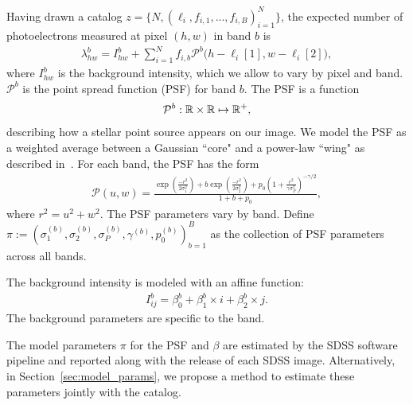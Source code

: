 Having drawn a catalog $z = \{N, (\ell_i, f_{i,1}, ..., f_{i,B})_{i = 1}^N\}$,
the expected number of photoelectrons measured at pixel $(h,w)$ in band $b$ is
\begin{align}
  \lambda^b_{hw} = I^{b}_{hw} + \sum_{i = 1}^N f_{i,b} \mathcal{P}^b\big(h - \ell_{i}[1], w - \ell_{i}[2]\big),
  \label{eq:expected_intensity}
\end{align}
where $I^{b}_{hw}$ is the background intensity, which we allow to vary by pixel and band. $\mathcal{P}^b$ is the point spread function (PSF) for band $b$. The PSF
is a function 
\begin{align}
\mathcal{P}^b : \mathbb{R} \times \mathbb{R} \mapsto \mathbb{R}^+,
\end{align}
describing how a stellar point source appears
on our image. We model the PSF as a weighted average between a Gaussian ``core" and a power-law ``wing" as described in~\cite{Xin2018psf}. For each band, the PSF has the form
\begin{align}
    \mathcal{P}(u,w) = \frac{\exp(\frac{-r^2}{2\sigma_1^2}) + 
                            b \exp(\frac{-r^2}{2\sigma_2^2}) + 
                            p_0(1 + \frac{r^2}{\gamma\sigma^2_P})^{-\gamma/2} }{1 + b + p_0},
\end{align}
where $r^2 = u^2 + w^2$. The PSF parameters vary by band. Define 
$\pi := (\sigma_{1}^{(b)}, \sigma_{2}^{(b)}, \sigma_{P}^{(b)}, \gamma^{(b)}, p_{0}^{(b)})_{b=1}^B$ as the collection of PSF parameters across all bands. 

The background intensity is modeled with an affine function: 
\begin{align}
    I_{ij}^{b} = \beta_0^{b} + \beta_1^{b} \times i + \beta_2^{b} \times j.
\end{align}
The background parameters are specific to the band. 

The model parameters $\pi$ for the PSF and $\beta$ are estimated by the SDSS software pipeline and reported along with the release of each SDSS image. Alternatively, in Section~\ref{sec:model_params}, we propose a method to estimate these parameters jointly with the catalog. 

